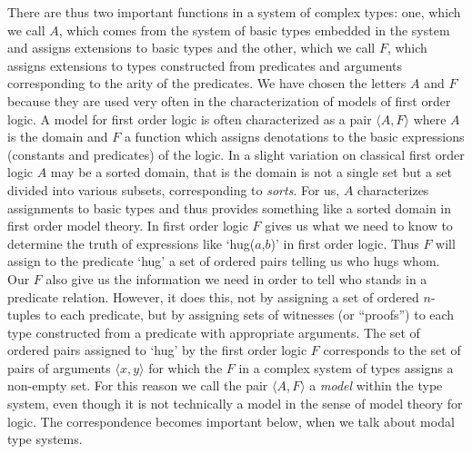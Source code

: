 There are thus two important functions
in a system of complex types:  one, which we call $A$, which comes from
the system of basic types embedded in the system and assigns
extensions to basic types and the other, which we call $F$, which
assigns extensions to types constructed from predicates and arguments
corresponding to the arity of the predicates.  We have chosen the
letters $A$ and $F$ because they are used very often in the
characterization of models \label{pg:models} of first order logic.  A model for first
order logic is often characterized as a pair $\langle A,F\rangle$
where $A$ is the domain and $F$ a function which assigns denotations to
the basic expressions (constants and predicates) of the logic.  In a
slight variation on classical first order logic $A$ may be a sorted
domain, that is the domain is not a single set but a set divided into
various subsets, corresponding to \textit{sorts}. For
us, $A$ characterizes assignments to basic types and thus provides
something like a sorted domain in first order model theory.  In first
order logic $F$ gives us what we need to know to determine the truth
of expressions like `hug($a$,$b$)' in first order logic.  Thus $F$ will
assign to the predicate `hug' a set of ordered pairs telling us who
hugs whom.  Our $F$ also give us the information we need in order to
tell who stands in a predicate relation.  However, it does this, not
by assigning a set of ordered $n$-tuples to each predicate, but by
assigning sets of witnesses (or ``proofs'') to each type constructed from a predicate with
appropriate arguments.  The set of ordered pairs assigned to `hug' by
the first order logic $F$ corresponds to the set of pairs of arguments
$\langle x,y\rangle$ for which the $F$ in a complex system of types
assigns a non-empty set.  For this reason we call the pair $\langle
A,F\rangle$ a \textit{model} within the type system, even though it is not
technically a model in the sense of model theory for logic.  The
correspondence becomes important below, when we talk about modal type
systems.

